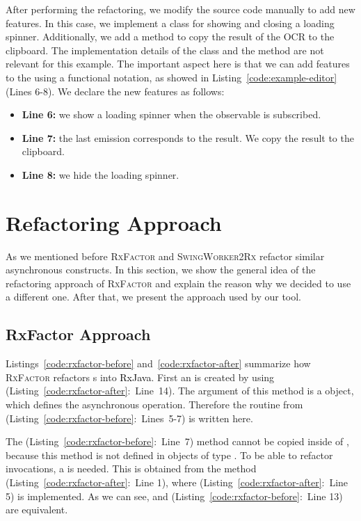 \documentclass[type=bsc,accentcolor=tud9c]{tudthesis}
\newcommand{\framework}[1]{\textcolor{black}{#1}}
\newcommand{\toolextension}{\textsc{SwingWorker2Rx}}
\begin{document}
After performing the refactoring, we modify the source code manually to add new features. In this case, we implement a  class for showing and closing a loading spinner. Additionally, we add a method to copy the result of the OCR to the clipboard. The implementation details of the  class and the  method are not relevant for this example. The important aspect here is that we can add features to the  using a functional notation, as showed in Listing~\ref{code:example-editor} (Lines 6-8). We declare the new features as follows:
\begin{itemize}
	\item {\bf Line 6:} we show a loading spinner when the observable is subscribed.
	\item {\bf Line 7:} the last emission corresponds to the result. We copy the result to the clipboard.
	\item {\bf Line 8:} we hide the loading spinner.
\end{itemize}

\section{Refactoring Approach}
As we mentioned before \textsc{RxFactor} and \toolextension{} refactor similar asynchronous constructs. In this section, we show the general idea of the refactoring approach of \textsc{RxFactor} and explain the reason why we decided to use a different one. After that, we present the approach used by our tool.

\subsection{RxFactor Approach}
Listings~\ref{code:rxfactor-before} and~\ref{code:rxfactor-after} summarize how \textsc{RxFactor} refactors s into \framework{RxJava}. First an  is created by using  (Listing~\ref{code:rxfactor-after}:~Line~14). The argument of this method is a  object, which defines the asynchronous operation. Therefore the routine from  (Listing~\ref{code:rxfactor-before}:~Lines~5-7) is written here. 

The  (Listing~\ref{code:rxfactor-before}:~Line~7) method cannot be copied inside of , because this method is not defined in objects of type . To be able to refactor  invocations, a  is needed. This  is obtained from the method  (Listing~\ref{code:rxfactor-after}:~Line 1), where  (Listing~\ref{code:rxfactor-after}:~Line 5) is implemented. As we can see,  and  (Listing~\ref{code:rxfactor-before}:~Line 13) are equivalent. 
\end{document}

